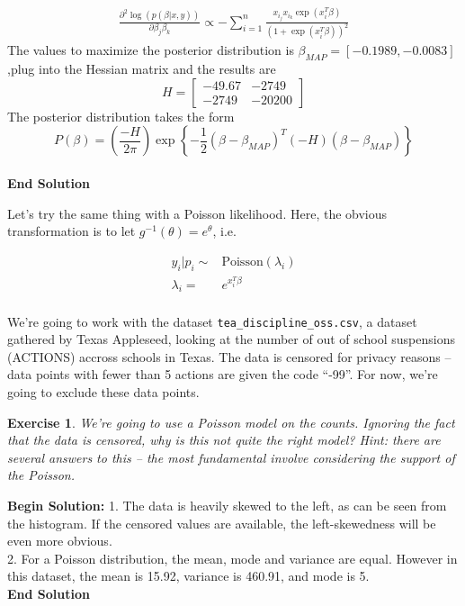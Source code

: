 \documentclass[twoside]{article}
\newcounter{lecnum}
\newtheorem{exercise}{Exercise}[lecnum]
\begin{document}
\begin{equation*}
\begin{split}
\frac{\partial^2 \log \left(p(\beta|x,y) \right)}{\partial \beta_j \beta_k} \propto -\sum_{i=1}^n\frac{x_{i_j}x_{i_k}\exp\left(x_i^T\beta\right)}{\left(1+\exp\left(x_i^T\beta\right)\right)^2}
\end{split}
\end{equation*}
The values to maximize the posterior distribution is $\beta_{MAP} = [-0.1989,-0.0083]$,plug into the Hessian matrix and the results are
$$
H = \begin{bmatrix}
    -49.67       & -2749 \\
    -2749       & -20200
\end{bmatrix}
$$
The posterior distribution takes the form
$$P(\beta) = \left(\frac{-H}{2\pi} \right)\exp \left\{-\frac{1}{2}\left(\beta - \beta_{MAP} \right)^T\left(-H \right) \left(\beta - \beta_{MAP} \right) \right\} $$\\
\textbf{End Solution}  

  Let's try the same thing with a Poisson likelihood. Here, the obvious transformation is to let $g^{-1}(\theta) = e^{\theta}$, i.e.

$$\begin{aligned}
  y_i|p_i \sim& \mbox{Poisson}(\lambda_i)\\
  \lambda_i =& e^{x_i^T\beta}\\
\end{aligned}$$

  We're going to work with the dataset \texttt{tea\_discipline\_oss.csv}, a dataset gathered by Texas Appleseed, looking at the number of out of school suspensions (ACTIONS) accross schools in Texas. The data is censored for privacy reasons -- data points with fewer than 5 actions are given the code ``-99''. For now, we're going to exclude these data points. 

  \begin{exercise}
    We're going to use a Poisson model on the counts. Ignoring the fact that the data is censored, why is this not quite the right model? \textit{Hint: there are several answers to this -- the most fundamental involve considering the support of the Poisson}.
  \end{exercise}
\textbf{Begin Solution:}
1. The data is heavily skewed to the left, as can be seen from the histogram. If the censored values are available, the left-skewedness will be even more obvious.\\
2. For a Poisson distribution, the mean, mode and variance are equal. However in this dataset, the mean is 15.92, variance is 460.91, and mode is 5.\\
\textbf{End Solution}
  
\end{document}
